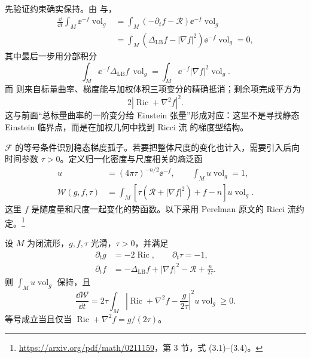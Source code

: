 先验证约束确实保持。由 与，
\begin{align*}
\frac{\dd}{\dd t}\int_M\ee^{-f}\operatorname{vol}_g
&=\int_M(-\partial_tf-\mathcal R)\ee^{-f}\operatorname{vol}_g\\
&=\int_M
(\Delta_{\mathrm{LB}}f-|\nabla f|^2)
\ee^{-f}\operatorname{vol}_g=0,
\end{align*}
其中最后一步用分部积分
\[
\int_M\ee^{-f}\Delta_{\mathrm{LB}}f\,\operatorname{vol}_g
=\int_M\ee^{-f}|\nabla f|^2\operatorname{vol}_g.
\]
而 则来自标量曲率、梯度能与加权体积三项变分的精确抵消；剩余项完成平方为
\[
2|\operatorname{Ric}+\nabla^2f|^2.
\]
这与前面“总标量曲率的一阶变分给 Einstein 张量”形成对应：这里不是寻找静态 Einstein 临界点，而是在加权几何中找到 Ricci 流 的梯度型结构。

$\mathcal F$ 的等号条件识别稳态梯度孤子。若要把整体尺度的变化也计入，需要引入后向时间参数 $\tau>0$。定义归一化密度与尺度相关的熵泛函
\begin{equation}\label{eq:math-dg-perelman-w-definition}
 \begin{aligned}
 u&=(4\pi\tau)^{-n/2}\ee^{-f},\qquad
 \int_Mu\operatorname{vol}_g=1,\\
 \mathcal W(g,f,\tau)
 &=\int_M\left[\tau(\mathcal R+|\nabla f|^2)+f-n\right]
 u\operatorname{vol}_g.
 \end{aligned}
\end{equation}
这里 $f$ 是随度量和尺度一起变化的势函数。以下采用 Perelman 原文的 Ricci 流约定。\footnote{\url{https://arxiv.org/pdf/math/0211159}，第 3 节，式 (3.1)--(3.4)。}

\begin{proposition}[尺度归一化熵的单调性]
设 $M$ 为闭流形，$g,f,\tau$ 光滑，$\tau>0$，并满足
\begin{equation}\label{eq:math-dg-perelman-w-coupled-flow}
 \begin{aligned}
 \partial_tg&=-2\operatorname{Ric},\qquad\partial_t\tau=-1,\\
 \partial_tf&=-\Delta_{\mathrm{LB}}f+|\nabla f|^2-\mathcal R+\frac n{2\tau}.
 \end{aligned}
\end{equation}
则 $\int_Mu\operatorname{vol}_g$ 保持，且
\begin{equation}\label{eq:math-dg-perelman-w-monotonicity}
 \frac{\dd\mathcal W}{\dd t}
 =2\tau\int_M
 \left|\operatorname{Ric}+\nabla^2f-\frac{g}{2\tau}\right|^2
 u\operatorname{vol}_g\ge0.
\end{equation}
等号成立当且仅当 $\operatorname{Ric}+\nabla^2f=g/(2\tau)$。
\end{proposition}

